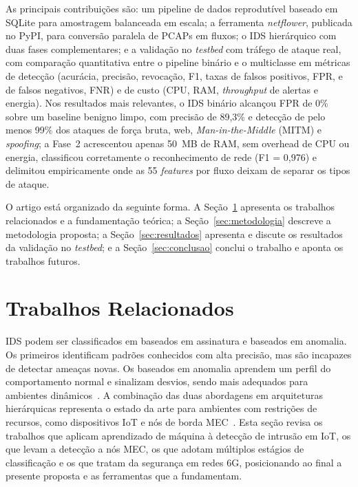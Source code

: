 \documentclass[12pt]{article}
\begin{document}
As principais contribuições são: um pipeline de dados reprodutível baseado em
SQLite para amostragem balanceada em escala; a ferramenta \textit{netflower},
publicada no PyPI, para conversão paralela de PCAPs em fluxos; o IDS hierárquico
com duas fases complementares; e a validação no \textit{testbed} com tráfego de
ataque real, com comparação quantitativa entre o pipeline binário e o
multiclasse em métricas de detecção (acurácia, precisão, revocação, F1, taxas de
falsos positivos, FPR, e de falsos negativos, FNR) e de custo (CPU, RAM,
\textit{throughput} de alertas e energia). Nos resultados mais relevantes, o IDS
binário alcançou FPR de 0\% sobre um baseline benigno limpo, com precisão de
89,3\% e detecção de pelo menos 99\% dos ataques de força bruta, web,
\textit{Man-in-the-Middle} (MITM) e \textit{spoofing}; a Fase~2 acrescentou
apenas 50~MB de RAM, sem overhead de CPU ou energia, classificou corretamente o
reconhecimento de rede (F1 = 0,976) e delimitou empiricamente onde as 55
\textit{features} por fluxo deixam de separar os tipos de ataque.

O artigo está organizado da seguinte forma. A Seção~\ref{trabalhosRelacionados} apresenta os trabalhos relacionados e a fundamentação teórica; a Seção~\ref{sec:metodologia} descreve a metodologia proposta; a Seção~\ref{sec:resultados} apresenta e discute os resultados da validação no \textit{testbed}; e a Seção~\ref{sec:conclusao} conclui o trabalho e aponta os trabalhos futuros.

\section{Trabalhos Relacionados}
\label{trabalhosRelacionados}

IDS podem ser classificados em baseados em assinatura e baseados em anomalia.
Os primeiros identificam padrões conhecidos com alta precisão, mas são incapazes de detectar ameaças novas. Os baseados em anomalia aprendem um perfil do comportamento normal e sinalizam desvios, sendo mais adequados para ambientes dinâmicos~\cite{lazarevic:05}. A combinação das duas abordagens em arquiteturas hierárquicas representa o estado da arte para ambientes com restrições de recursos, como dispositivos IoT e nós de borda MEC~\cite{zolanvari:19}. Esta seção revisa os trabalhos que aplicam aprendizado de máquina à detecção de intrusão em IoT, os que levam a detecção a nós MEC, os que adotam múltiplos estágios de classificação e os que tratam da segurança em redes 6G, posicionando ao final a presente proposta e as ferramentas que a fundamentam.
\end{document}
